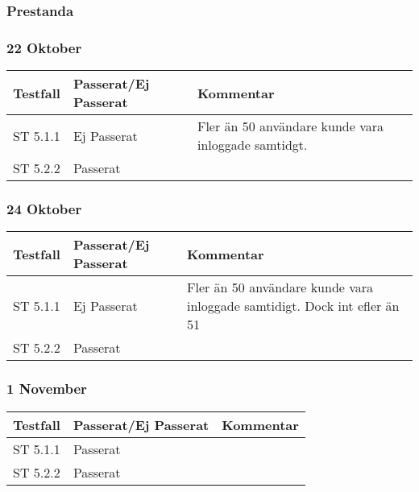 \documentclass[a4paper]{article}
\begin{document}
\subsubsection{Prestanda}

\subsubsection{22 Oktober}
\begin{tabular}{| l | l | p{9cm} |}
\hline
Testfall &  Passerat/Ej Passerat & Kommentar\\
\hline
ST 5.1.1 & Ej Passerat & Fler än 50 användare kunde vara inloggade samtidgt.\\
\hline
ST 5.2.2 & Passerat &\\
\hline
\end{tabular}

\subsubsection{24 Oktober}
\begin{tabular}{| l | l | p{9cm} |}
\hline
Testfall &  Passerat/Ej Passerat & Kommentar\\
\hline
ST 5.1.1 & Ej Passerat & Fler än 50 användare kunde vara inloggade samtidigt. Dock int efler än 51\\
\hline
ST 5.2.2 & Passerat & \\
\hline
\end{tabular}

\subsubsection{1 November}
\begin{tabular}{| l | l | p{9cm} |}
\hline
Testfall &  Passerat/Ej Passerat & Kommentar\\
\hline
ST 5.1.1 & Passerat & \\
\hline
ST 5.2.2 & Passerat & \\
\hline
\end{tabular}

\end{document}
